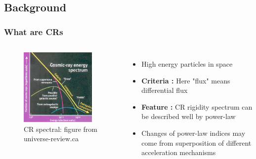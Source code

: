 \documentclass{beamer}
\begin{document}
\subsection{Background}
\begin{frame}
\frametitle{What are CRs}
  \begin{columns}

      \begin{figure}
      \includegraphics[height=0.7\textheight, width=0.9\textwidth]{CRFeature}
      \caption{CR spectral: figure from  universe-review.ca }
      \end{figure}

      \begin{itemize}
      \item{High energy particles in space}
      \\ 
      \item{\textbf{Criteria :} Here "flux" means differential flux}
      \\ 
      \item{\textbf{Feature :} CR rigidity spectrum can be described well by power-law }
      \item{Changes of power-law indices may come from superposition of different acceleration mechanisms}
      \end{itemize}
  \end{columns}
\end{frame}
\end{document}
